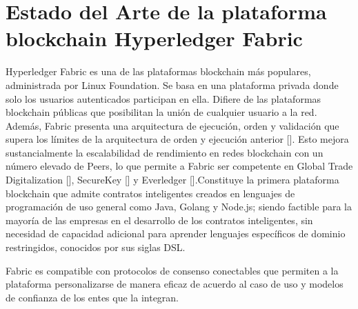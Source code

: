 \chapter{Estado del Arte de la plataforma blockchain Hyperledger Fabric}\label{chapter:state-of-the-art}

Hyperledger Fabric es una de las plataformas blockchain m\'as populares, administrada por Linux Foundation. Se basa en una plataforma privada donde solo los usuarios autenticados participan en ella. Difiere de las plataformas blockchain p\'ublicas que posibilitan la uni\'on de cualquier usuario a la red. Adem\'as, Fabric presenta una arquitectura de ejecuci\'on, orden y validaci\'on que supera los l\'imites de la arquitectura de orden y ejecuci\'on anterior []. Esto mejora sustancialmente la escalabilidad de rendimiento en redes blockchain con un n\'umero elevado de Peers, lo que permite a Fabric ser competente en Global Trade Digitalization [], SecureKey [] y Everledger [].Constituye la primera plataforma blockchain que admite contratos inteligentes creados en lenguajes de programaci\'on de uso general como Java, Golang y Node.js; siendo factible para la mayor\'ia de las empresas en el desarrollo de los contratos inteligentes, sin necesidad de capacidad adicional para aprender lenguajes espec\'ificos de dominio restringidos, conocidos por sus siglas DSL. 

Fabric es compatible con protocolos de consenso conectables que permiten a la plataforma personalizarse de manera eficaz de acuerdo al caso de uso y modelos de confianza de los entes que la integran. 

